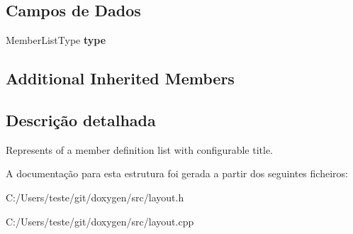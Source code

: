 \subsection*{Campos de Dados}
\begin{DoxyCompactItemize}
\item 
\hypertarget{struct_layout_doc_entry_member_def_ac52a09d0822d464897136e74d416ac69}{Member\-List\-Type {\bfseries type}}\label{struct_layout_doc_entry_member_def_ac52a09d0822d464897136e74d416ac69}

\end{DoxyCompactItemize}
\subsection*{Additional Inherited Members}


\subsection{Descrição detalhada}
Represents of a member definition list with configurable title. 

A documentação para esta estrutura foi gerada a partir dos seguintes ficheiros\-:\begin{DoxyCompactItemize}
\item 
C\-:/\-Users/teste/git/doxygen/src/layout.\-h\item 
C\-:/\-Users/teste/git/doxygen/src/layout.\-cpp\end{DoxyCompactItemize}
